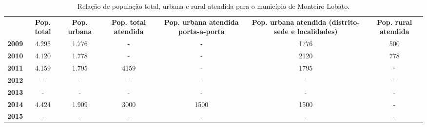 \begin{table}[htbp]
  \centering
  \caption{Relação de população total, urbana e rural atendida para o município de Monteiro Lobato.}
    \begin{tabular}{c|c|c|c|c|c|c}
    \rowcolor[rgb]{ .969,  .588,  .275} 
    \multicolumn{1}{P{1cm}|}{\textcolor[rgb]{ 1,  1,  1}{\textbf{Ano}}} & \multicolumn{1}{P{1.2cm}|}{\textcolor[rgb]{ 1,  1,  1}{\textbf{Pop. total}}} & \multicolumn{1}{P{1.2cm}|}{\textcolor[rgb]{ 1,  1,  1}{\textbf{Pop. urbana}}} & \multicolumn{1}{P{1.5cm}|}{\textcolor[rgb]{ 1,  1,  1}{\textbf{Pop. total atendida}}} & \multicolumn{1}{P{2cm}|}{\textcolor[rgb]{ 1,  1,  1}{\textbf{Pop. urbana atendida porta-a-porta}}} & 
    \multicolumn{1}{P{2cm}|}{\textcolor[rgb]{ 1,  1,  1}{\textbf{Pop. urbana atendida (distrito-sede e localidades)}}} & 
    \multicolumn{1}{P{2cm}}{\textcolor[rgb]{ 1,  1,  1}{\textbf{Pop. rural atendida}}} \\
    \rowcolor[rgb]{ .984,  .831,  .706} \textbf{2009} & 4.295 & 1.776 & -     & -     & 1776  & 500 \\
    \rowcolor[rgb]{ .992,  .914,  .851} \textbf{2010} & 4.120 & 1.778 & -     & -     & 2120  & 778 \\
    \rowcolor[rgb]{ .984,  .831,  .706} \textbf{2011} & 4.159 & 1.795 & 4159  & -     & 1795  & - \\
    \rowcolor[rgb]{ .992,  .914,  .851} \textbf{2012} & -     & -     & -     & -     & -     & - \\
    \rowcolor[rgb]{ .984,  .831,  .706} \textbf{2013} & -     & -     & -     & -     & -     & - \\
    \rowcolor[rgb]{ .992,  .914,  .851} \textbf{2014} & 4.424 & 1.909 & 3000  & 1500  & 1500  & - \\
    \rowcolor[rgb]{ .984,  .831,  .706} \textbf{2015} & -     & -     & -     & -     & -     & - \\
    \end{tabular}%
  \label{tab:pop_atendida}%
\end{table}%
